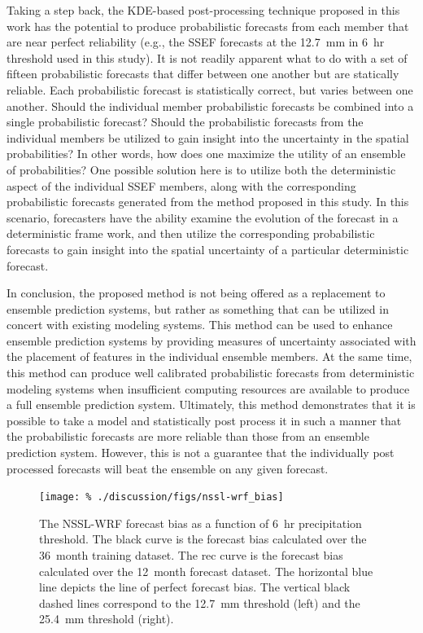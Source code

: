 Taking a step back, the KDE-based post-processing technique proposed in this work has the potential to produce probabilistic forecasts from each member that are near perfect reliability (e.g., the SSEF forecasts at the \mbox{12.7 mm} in \mbox{6 hr} threshold used in this study).
It is not readily apparent what to do with a set of fifteen probabilistic forecasts that differ between one another but are statically reliable.
Each probabilistic forecast is statistically correct, but varies between one another.
Should the individual member probabilistic forecasts be combined into a single probabilistic forecast?
Should the probabilistic forecasts from the individual members be utilized to gain insight into the uncertainty in the spatial probabilities?
In other words, how does one maximize the utility of an ensemble of probabilities?
One possible solution here is to utilize both the deterministic aspect of the individual SSEF members, along with the corresponding probabilistic forecasts generated from the method proposed in this study.
In this scenario, forecasters have the ability examine the evolution of the forecast in a deterministic frame work, and then utilize the corresponding probabilistic forecasts to gain insight into the spatial uncertainty of a particular deterministic forecast.


In conclusion, the proposed method is not being offered as a replacement to ensemble prediction systems, but rather as something that can be utilized in concert with existing modeling systems.
This method can be used to enhance ensemble prediction systems by providing measures of uncertainty associated with the placement of features in the individual ensemble members.
At the same time, this method can produce well calibrated probabilistic forecasts from deterministic modeling systems when insufficient computing resources are available to produce a full ensemble prediction system.
Ultimately, this method demonstrates that it is possible to take a model and statistically post process it in such a manner that the probabilistic forecasts are more reliable than those from an ensemble prediction system.
However, this is not a guarantee that the individually post processed forecasts will beat the ensemble on any given forecast.











\clearpage
\begin{figure}[cc]
    \centering
    \texttt{[image: \%
    ./discussion/figs/nssl-wrf\_bias]}\\
    \caption{The NSSL-WRF forecast bias as a function of \mbox{6 hr} precipitation threshold.
    The black curve is the forecast bias calculated over the \mbox{36 month} training dataset.
    The rec curve is the forecast bias calculated over the \mbox{12 month} forecast dataset.
    The horizontal blue line depicts the line of perfect forecast bias.
    The vertical black dashed lines correspond to the \mbox{12.7 mm} threshold (left) and the \mbox{25.4 mm} threshold (right).}
    \label{nssl-wrf_bias}
\end{figure}


